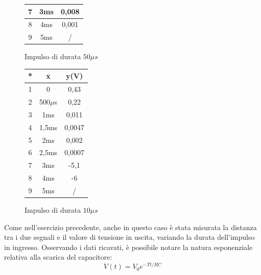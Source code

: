 \begin{figure}[ht]
\begin{minipage}{0.33\textwidth}
\begin{tabular}{c|c|c}
            \hline
            7 & 3ms & 0,008 \\
            \hline
            8 & 4ms & 0,001\\
            \hline
            9 & 5ms & / \\
        \end{tabular}
        \caption{Impulso di durata $50\mu s$}
    \end{minipage}%
    \begin{minipage}{0.33\textwidth}
        \centering
        \begin{tabular}{c|c|c}
            * & x & y(V) \\
            \hline
            1 & 0 & 0,43 \\
            \hline
            2 & 500$\mu$s & 0,22 \\
            \hline
            3 & 1ms & 0,011 \\
            \hline
            4 & 1,5ms & 0,0047 \\
            \hline
            5 & 2ms & 0,002 \\
            \hline
            6 & 2,5ms & 0,0007 \\
            \hline
            7 & 3ms & -5,1 \\
            \hline
            8 & 4ms & -6 \\
            \hline
            9 & 5ms & / \\
        \end{tabular}
        \caption{Impulso di durata $10\mu s$}
    \end{minipage}
\end{figure}
\newline
Come nell’esercizio precedente, anche in questo caso è stata misurata la distanza tra i due segnali e il valore di tensione in uscita, variando la durata dell’impulso in ingresso. Osservando i dati ricavati, è possibile notare la natura esponenziale relativa alla scarica del capacitore:
$$V(t) = V_0 e^{-Tt/RC}$$
\newpage
